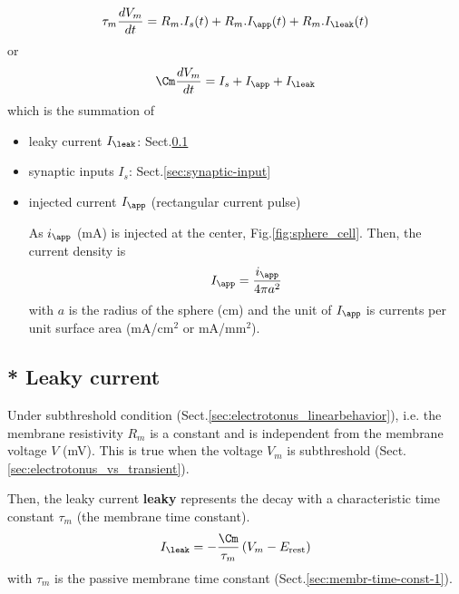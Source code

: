 \begin{equation}
\tau_m \frac{dV_m}{dt} = 	R_m.I_s(t) + R_m. I_\app(t) + R_m. I_\leak(t) 
\label{eq:leaky_integrator}
\end{equation}
or
\begin{equation}
\Cm \frac{dV_m}{dt} = I_s  + I_\app + I_\leak
\end{equation}
which is the summation of
\begin{itemize}
  \item leaky current $I_\leak$: Sect.\ref{sec:leaky-current}

  \item synaptic inputs $I_s$: Sect.\ref{sec:synaptic-input}

  
  \item injected current $I_\app$ (rectangular current pulse)

As $i_\app$ (mA) is injected at the center, Fig.\ref{fig:sphere_cell}.
Then, the current density is
\begin{eqnarray}
  \label{eq:4071}
  I_\app = \frac{i_\app}{4\pi a^2}
\end{eqnarray}
with $a$ is the radius of the sphere (cm) and the unit of $I_\app$ is
currents per unit surface area (mA/cm$^2$ or mA/mm$^2$).

\end{itemize}



\subsection{ * Leaky current}
\label{sec:leaky-current}

Under subthreshold condition (Sect.\ref{sec:electrotonus_linearbehavior}), i.e.
the membrane resistivity $R_m$ is a constant and is independent from the
membrane voltage $V$ (mV). This is true when the voltage $V_m$ is subthreshold
(Sect.\ref{sec:electrotonus_vs_transient}).

Then, the leaky current {\bf leaky} represents the decay with a characteristic
time constant $\tau_m$ (the membrane time constant). 
\begin{equation}
I_\leak = - \frac{\Cm}{\tau_m}\left( V_m - E_\rest \right)
\end{equation}
with $\tau_m$ is the passive membrane time constant
(Sect.\ref{sec:membr-time-const-1}).

